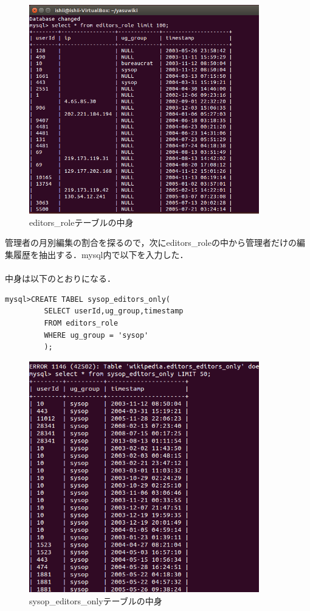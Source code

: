 \begin{figure}[H]
\centering
\includegraphics[width=10cm]{editors_role1.png}
\caption{editors\_roleテーブルの中身}\label{サンプル図}
\end{figure}

\clearpage


管理者の月別編集の割合を探るので，次にeditors\_roleの中から管理者だけの編集履歴を抽出する．mysql内で以下を入力した．\\
\\
中身は以下のとおりになる．

{\small
\begin{verbatim}
mysql>CREATE TABEL sysop_editors_only(
         SELECT userId,ug_group,timestamp
         FROM editors_role
         WHERE ug_group = 'sysop'
         );
\end{verbatim}}


\begin{figure}[H]
\centering
\includegraphics[width=10cm]{sysop_editors_only1.png}
\caption{sysop\_editors\_onlyテーブルの中身}\label{サンプル図}
\end{figure}



